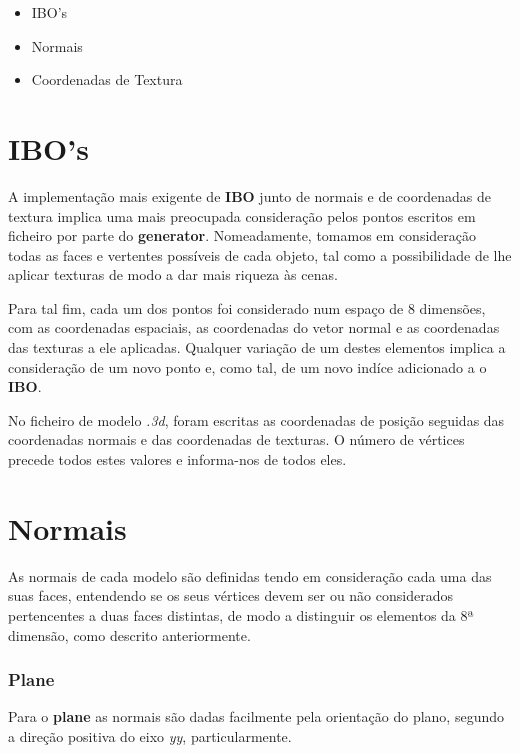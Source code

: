 \documentclass[14pt, a4 paper]{report}
\begin{document}
\begin{itemize}
\item IBO's

\item Normais

\item Coordenadas de Textura
\end{itemize}

\section{IBO's}

A implementação mais exigente de \textbf{IBO} junto de normais e de coordenadas de textura implica uma mais preocupada consideração pelos pontos escritos em ficheiro por parte do \textbf{generator}. Nomeadamente, tomamos em consideração todas as faces e vertentes possíveis de cada objeto, tal como a possibilidade de lhe aplicar texturas de modo a dar mais riqueza às cenas. 

Para tal fim, cada um dos pontos foi considerado num espaço de 8 dimensões, com as coordenadas espaciais, as coordenadas do vetor normal e as coordenadas das texturas a ele aplicadas. Qualquer variação de um destes elementos implica a consideração de um novo ponto e, como tal, de um novo indíce adicionado a o \textbf{IBO}.

No ficheiro de modelo \textit{.3d}, foram escritas as coordenadas de posição seguidas das coordenadas normais e das coordenadas de texturas. O número de vértices precede todos estes valores e informa-nos de todos eles.

\section{Normais}

As normais de cada modelo são definidas tendo em consideração cada uma das suas faces, entendendo se os seus vértices devem ser ou não considerados pertencentes a duas faces distintas, de modo a distinguir os elementos da 8ª dimensão, como descrito anteriormente.

\subsubsection{Plane}

Para o \textbf{plane} as normais são dadas facilmente pela orientação do plano, segundo a direção positiva do eixo \textit{yy}, particularmente.
\end{document}
